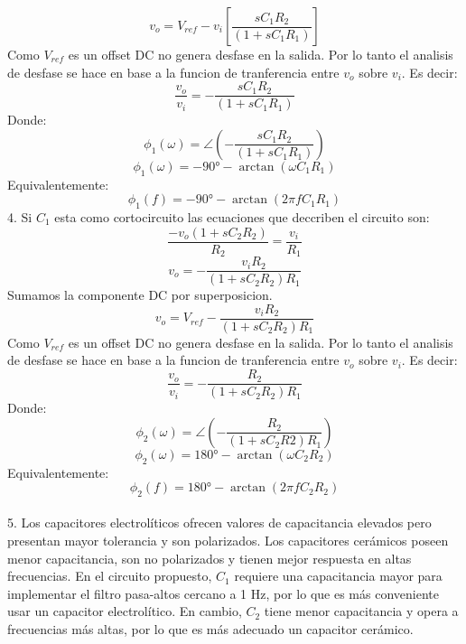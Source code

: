 \documentclass[letterpaper, 12pt]{article}
\begin{document}
\[
v_o = V_{ref} - v_i \left[\frac{sC_1R_2}{(1+sC_1R_1)}\right]
\]
Como \(V_{ref}\) es un offset DC no genera desfase en la salida. Por lo tanto el analisis de desfase se hace en base a la funcion de tranferencia entre \(v_{o}\) sobre \(v_{i}\). Es decir:
\[
\frac{v_o}{v_i}=-\frac{sC_1R_2}{(1+sC_1R_1)}
\]
Donde:
\[
\phi_1(\omega) =\angle\left(-\frac{sC_1R_2}{(1+sC_1R_1)}\right)
\]
\[
\phi_1(\omega)=-90\text{°} -\arctan\left(\omega C_1 R_1\right)
\]
Equivalentemente:
\[
\phi_1(f)=-90 \text{°}  -\arctan\left(2\pi f C_1 R_1\right)
\]
4. Si \(C_1\) esta como cortocircuito las ecuaciones que deccriben el circuito son:
\[
\frac{-v_o(1+sC_2R_2)}{R_2}= \frac{v_i}{R_1}
\]
\[
v_o= -\frac{v_iR_2}{(1+sC_2R_2)R_1}
\]
Sumamos la componente DC por superposicion.
\[
v_o= V_{ref}-\frac{v_iR_2}{(1+sC_2R_2)R_1}
\]
Como \(V_{ref}\) es un offset DC no genera desfase en la salida. Por lo tanto el analisis de desfase se hace en base a la funcion de tranferencia entre \(v_{o}\) sobre \(v_{i}\). Es decir:
\[
\frac{v_o}{v_i} = -\frac{R_2}{(1+sC_2R_2)R_1}
\]
Donde:
\[
\phi_2(\omega) =\angle\left(-\frac{R_2}{(1+sC_2R2)R_1}\right)
\]
\[
\phi_2(\omega)=180\text{°} -\arctan\left(\omega C_2R_2 \right)
\]
Equivalentemente:
\[
\phi_2(f)=180\text{°} -\arctan\left(2\pi f C_2R_2 \right)
\]\\
5. Los capacitores electrolíticos ofrecen valores de capacitancia elevados pero presentan mayor tolerancia y son polarizados. Los capacitores cerámicos poseen menor capacitancia, son no polarizados y tienen mejor respuesta en altas frecuencias.
En el circuito propuesto, \(C_1\) requiere una capacitancia mayor para implementar el filtro pasa-altos cercano a 1 Hz, por lo que es más conveniente usar un capacitor electrolítico. En cambio, \(C_2\) tiene menor capacitancia y opera a frecuencias más altas, por lo que es más adecuado un capacitor cerámico.\\
\end{document}
